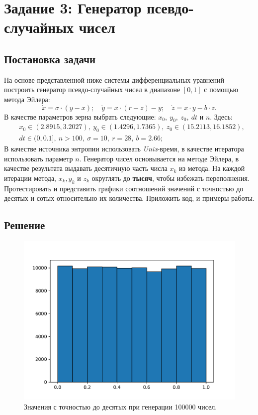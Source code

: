 \section{Задание 3: Генератор псевдо-случайных чисел}
    \subsection{Постановка задачи}
        На основе представленной ниже системы дифференциальных уравнений построить генератор псевдо-случайных чисел в диапазоне \( [0, 1] \) с помощью метода Эйлера:
        \[ \dot{x} = \sigma \cdot (y - x); \quad \dot{y} = x \cdot (r - z) - y; \quad \dot{z} = x \cdot y - b \cdot z. \]
        В качестве параметров зерна выбрать следующие: \( x_0, ~ y_0, ~ z_0, ~ dt \) и \( n \). Здесь:
        \[ \begin{aligned}
            &x_0 \in (2.8915, 3.2027), ~
            y_0 \in (1.4296, 1.7365), ~
            z_0 \in (15.2113, 16.1852), \\
            &dt \in (0, 0.1], ~
            n > 100, ~
            \sigma = 10, ~
            r = 28, ~
            b = 2.66;
        \end{aligned} \]
        В качестве источника энтропии использовать \textit{Unix}-время, в качестве итератора использовать параметр \( n \). Генератор чисел основывается на методе Эйлера, в качестве результата выдавать десятичную часть числа \( x_k \) из метода. На каждой итерации метода, \( x_k, y_k \) и \( z_k \) округлять до \textbf{тысяч}, чтобы избежать переполнения. Протестировать и представить графики соотношений значений с точностью до десятых и сотых относительно их количества. Приложить код, и примеры работы. 

    
    \subsection{Решение}
        \begin{figure}[H]
            \centering
            \includegraphics[width=14cm]{pictures/task3_1.pdf}
            \caption{Значения с точностью до десятых при генерации 100000 чисел.}
        \end{figure}


